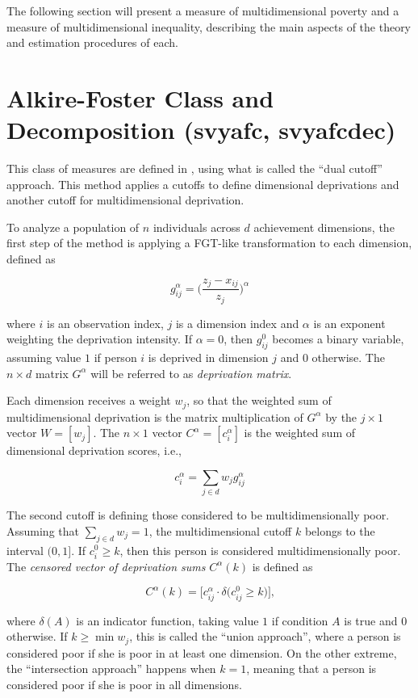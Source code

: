 \documentclass[]{book}
\theoremstyle{definition}
\theoremstyle{definition}
\theoremstyle{remark}
\begin{document}
The following section will present a measure of multidimensional poverty
and a measure of multidimensional inequality, describing the main
aspects of the theory and estimation procedures of each.

\section{Alkire-Foster Class and Decomposition (svyafc,
svyafcdec)}\label{alkire-foster-class-and-decomposition-svyafc-svyafcdec}

This class of measures are defined in \citet{alkire2011}, using what is
called the ``dual cutoff'' approach. This method applies a cutoffs to
define dimensional deprivations and another cutoff for multidimensional
deprivation.

To analyze a population of \(n\) individuals across \(d\) achievement
dimensions, the first step of the method is applying a FGT-like
transformation to each dimension, defined as

\[
g_{ij}^\alpha = \bigg( \frac{ z_j - x_{ij} }{ z_j } \bigg)^{\alpha}
\]

where \(i\) is an observation index, \(j\) is a dimension index and
\(\alpha\) is an exponent weighting the deprivation intensity. If
\(\alpha=0\), then \(g_{ij}^0\) becomes a binary variable, assuming
value \(1\) if person \(i\) is deprived in dimension \(j\) and \(0\)
otherwise. The \(n \times d\) matrix \(G^\alpha\) will be referred to as
\emph{deprivation matrix}.

Each dimension receives a weight \(w_j\), so that the weighted sum of
multidimensional deprivation is the matrix multiplication of
\(G^\alpha\) by the \(j \times 1\) vector \(W = [w_j]\). The
\(n \times 1\) vector \(C^\alpha = [c^\alpha_i]\) is the weighted sum of
dimensional deprivation scores, i.e.,

\[
c^\alpha_{i} = \sum_{j \in d} w_j g_{ij}^\alpha
\]

The second cutoff is defining those considered to be multidimensionally
poor. Assuming that \(\sum_{j \in d} w_j = 1\), the multidimensional
cutoff \(k\) belongs to the interval \((0,1]\). If
\(c^0_{i} \geqslant k\), then this person is considered
multidimensionally poor. The \emph{censored vector of deprivation sums}
\(C^\alpha(k)\) is defined as

\[
C^\alpha (k) = \bigg[ c_{ij}^\alpha \cdot \delta \big( c_{ij}^0 \geqslant k \big) \bigg] \text{,}
\]

where \(\delta(A)\) is an indicator function, taking value \(1\) if
condition \(A\) is true and \(0\) otherwise. If
\(k \geqslant \min{ w_j }\), this is called the ``union approach'',
where a person is considered poor if she is poor in at least one
dimension. On the other extreme, the ``intersection approach'' happens
when \(k = 1\), meaning that a person is considered poor if she is poor
in all dimensions.
\end{document}
